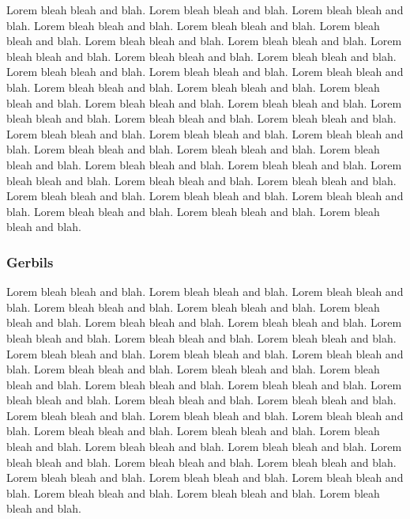 \documentclass[letterpaper,10pt]{article}
\begin{document}
Lorem bleah bleah and blah. Lorem bleah bleah and blah. Lorem bleah
bleah and blah. Lorem bleah bleah and blah. Lorem bleah bleah and
blah. Lorem bleah bleah and blah. Lorem bleah bleah and blah. Lorem
bleah bleah and blah. Lorem bleah bleah and blah. Lorem bleah bleah
and blah. Lorem bleah bleah and blah. Lorem bleah bleah and blah.
Lorem bleah bleah and blah. Lorem bleah bleah and blah. Lorem bleah
bleah and blah. Lorem bleah bleah and blah. Lorem bleah bleah and
blah. Lorem bleah bleah and blah. Lorem bleah bleah and blah. Lorem
bleah bleah and blah. Lorem bleah bleah and blah. Lorem bleah bleah
and blah. Lorem bleah bleah and blah. Lorem bleah bleah and blah.
Lorem bleah bleah and blah. Lorem bleah bleah and blah. Lorem bleah
bleah and blah. Lorem bleah bleah and blah. Lorem bleah bleah and
blah. Lorem bleah bleah and blah. Lorem bleah bleah and blah. Lorem
bleah bleah and blah. Lorem bleah bleah and blah. Lorem bleah bleah
and blah. Lorem bleah bleah and blah. Lorem bleah bleah and blah.
Lorem bleah bleah and blah. Lorem bleah bleah and blah. Lorem bleah
bleah and blah.

\subsubsection{Gerbils}
Lorem bleah bleah and blah. Lorem bleah bleah and blah. Lorem bleah
bleah and blah. Lorem bleah bleah and blah. Lorem bleah bleah and
blah. Lorem bleah bleah and blah. Lorem bleah bleah and blah. Lorem
bleah bleah and blah. Lorem bleah bleah and blah. Lorem bleah bleah
and blah. Lorem bleah bleah and blah. Lorem bleah bleah and blah.
Lorem bleah bleah and blah. Lorem bleah bleah and blah. Lorem bleah
bleah and blah. Lorem bleah bleah and blah. Lorem bleah bleah and
blah. Lorem bleah bleah and blah. Lorem bleah bleah and blah. Lorem
bleah bleah and blah. Lorem bleah bleah and blah. Lorem bleah bleah
and blah. Lorem bleah bleah and blah. Lorem bleah bleah and blah.
Lorem bleah bleah and blah. Lorem bleah bleah and blah. Lorem bleah
bleah and blah. Lorem bleah bleah and blah. Lorem bleah bleah and
blah. Lorem bleah bleah and blah. Lorem bleah bleah and blah. Lorem
bleah bleah and blah. Lorem bleah bleah and blah. Lorem bleah bleah
and blah. Lorem bleah bleah and blah. Lorem bleah bleah and blah.
Lorem bleah bleah and blah. Lorem bleah bleah and blah. Lorem bleah
bleah and blah.
\end{document}
